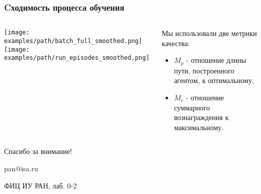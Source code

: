 \documentclass[default]{beamer}
\begin{document}
	\begin{frame}
		\frametitle{Cходимость процесса обучения}
		\begin{columns}
			\begin{column}{0.65\textwidth}
				\centering
				\texttt{[image: examples/path/batch\_full\_smoothed.png]}
				\vspace*{-10pt}
				\texttt{[image: examples/path/run\_episodes\_smoothed.png]}
			\end{column}
			\begin{column}{0.35\textwidth}
				Мы использовали две метрики качества:
				\begin{itemize}
					\item $M_p$ - отношение длины пути, построенного агентом, к оптимальному,
					\item $M_r$ - отношение суммарного вознаграждения к максимальному.
				\end{itemize}
			\end{column}
		\end{columns}
		
		
	\end{frame}

	\begin{frame}
		\centering
		\Huge
		Спасибо за внимание!
		\normalsize
		\par\bigskip
		\par\bigskip
		\par\bigskip
		pan@isa.ru
		\par\bigskip
		ФИЦ ИУ РАН, лаб. 0-2
	\end{frame}			
\end{document}

